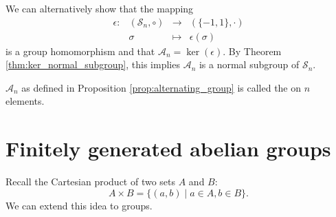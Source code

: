 We can alternatively show that the mapping
\begin{equation*}
    \begin{array}{rccc}
        \epsilon: & (\mathcal{S}_n,\circ) & \to & (\{-1,1\},\cdot) \\
        & \sigma & \mapsto & \epsilon(\sigma)
    \end{array}
\end{equation*}
is a group homomorphism and that $ \mathcal{A}_n=\ker(\epsilon) $. By Theorem \ref{thm:ker_normal_subgroup}, this implies $ \mathcal{A}_n $ is a normal subgroup of $ \mathcal{S}_n $.

\begin{defn}
$ \mathcal{A}_n $ as defined in Proposition \ref{prop:alternating_group} is called the  on $ n $ elements.
\end{defn}

\section{Finitely generated abelian groups}

Recall the Cartesian product of two sets $ A $ and $ B $:
\begin{equation*}
    A\times B=\{(a,b)\mid a\in A,b\in B\}.
\end{equation*}
We can extend this idea to groups.

